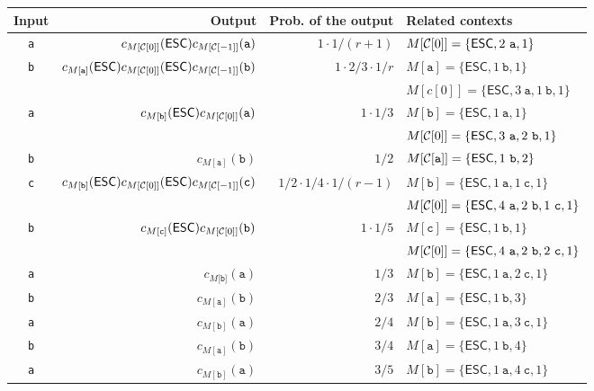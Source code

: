   \begin{tabular}{crrl}
    Input & Output & Prob. of the output & Related contexts\\
    \hline
    {\tt a} & $c_{M[{\cal C}[0]]}(\mathsf{ESC})c_{M[{\cal C}[-1]]}(\mathtt{a})$ & $1\cdot 1/(r+1)$ & $M[{\cal C}[0]]=\{\mathsf{ESC},2~\mathtt{a},1\}$\\
    {\tt b} & $c_{M[\texttt{a}]}(\mathsf{ESC})c_{M[{\cal C}[0]]}(\mathsf{ESC})c_{M[{\cal C}[-1]]}(\mathtt{b})$ & $1\cdot 2/3\cdot 1/r$ & $M[\mathtt{a}]=\{\mathsf{ESC},1~\mathtt{b},1\}$\\
    ~       & & & $M[c[0]]=\{\mathsf{ESC},3~\mathtt{a},1~\mathtt{b},1\}$\\
    {\tt a} & $c_{M[\texttt{b}]}(\mathsf{ESC})c_{M[{\cal C}[0]]}(\mathtt a)$ & $1\cdot 1/3$ & $M[\mathtt{b}]=\{\mathsf{ESC},1~\mathtt{a},1\}$\\
    ~       & & & $M[{\cal C}[0]]=\{\mathsf{ESC},3~\mathtt{a},2~\mathtt{b},1\}$\\
    {\tt b} & $c_{M[\mathtt{a}]}(\mathtt b)$ & $1/2$ & $M[{\cal C}[\mathtt{a}]]=\{\mathsf{ESC},1~\mathtt{b},2\}$\\
    {\tt c} & $c_{M[\mathtt{b}]}(\mathsf{ESC})c_{M[{\cal C}[0]]}(\mathsf{ESC})c_{M[{\cal C}[-1]]}(\mathtt c)$ & $1/2\cdot 1/4\cdot 1/(r-1)$ & $M[\mathtt{b}]=\{\mathsf{ESC},1~\mathtt{a},1~\mathtt{c},1\}$\\
    ~       & & & $M[{\cal C}[0]]=\{\mathsf{ESC},4~\mathtt{a},2~\mathtt{b},1~\mathtt{c},1\}$\\
    {\tt b} & $c_{M[\texttt{c}]}(\mathsf{ESC})c_{M[{\cal C}[0]]}(\mathtt b)$ & $1\cdot 1/5$ & $M[\mathtt{c}]=\{\mathsf{ESC},1~\mathtt{b},1\}$\\
    ~       & & & $M[{\cal C}[0]]=\{\mathsf{ESC},4~\mathtt{a},2~\mathtt{b},2~\mathtt{c},1\}$\\ 
    {\tt a} & $c_{M[\mathtt{b]}}(\mathtt a)$ & $1/3$ & $M[\mathtt{b}]=\{\mathsf{ESC},1~\mathtt{a},2~\mathtt{c},1\}$\\
    {\tt b} & $c_{M[\mathtt{a}]}(\mathtt b)$ & $2/3$ & $M[\mathtt{a}]=\{\mathsf{ESC},1~\mathtt{b},3\}$\\
    {\tt a} & $c_{M[\mathtt{b}]}(\mathtt a)$ & $2/4$ & $M[\mathtt{b}]=\{\mathsf{ESC},1~\mathtt{a},3~\mathtt{c},1\}$\\
    {\tt b} & $c_{M[\mathtt{a}]}(\mathtt b)$ & $3/4$ & $M[\mathtt{a}]=\{\mathsf{ESC},1~\mathtt{b},4\}$\\
    {\tt a} & $c_{M[\mathtt{b}]}(\mathtt a)$ & $3/5$ & $M[\mathtt{b}]=\{\mathsf{ESC},1~\mathtt{a},4~\mathtt{c},1\}$\\

\end{tabular}
